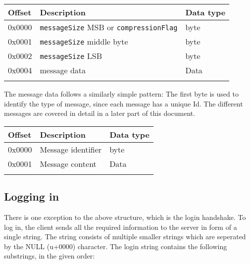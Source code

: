 \documentclass{article}
\newcommand{\field}[1]{\textcolor{fieldColor}{\texttt{#1}}}
\newenvironment{bytelisting}
{\ttfamily \begin{center} \begin{tabular}{l l l} Offset & Description & Data type \\ \hline}
{\normalfont \end{tabular} \end{center}}
\begin{document}
\begin{bytelisting}
0x0000 & \field{messageSize} MSB or \field{compressionFlag} & byte \\
0x0001 & \field{messageSize} middle byte & byte\\
0x0002 & \field{messageSize} LSB & byte\\
0x0004 & message data & Data\\
\end{bytelisting}

The message data follows a similarly simple pattern: The first byte is used to identify the type of message, since each message has a unique Id.
The different messages are covered in detail in a later part of this document.

\begin{bytelisting}
0x0000 & Message identifier & byte \\
0x0001 & Message content & Data\\
\end{bytelisting}

\subsection{Logging in}
There is one exception to the above structure, which is the login handshake. To log in, the client sends all the required information to the server in form of a single string.
The string consists of multiple smaller strings which are seperated by the NULL (u+0000) character. The login string contains the following substrings, in the given order:
\end{document}
